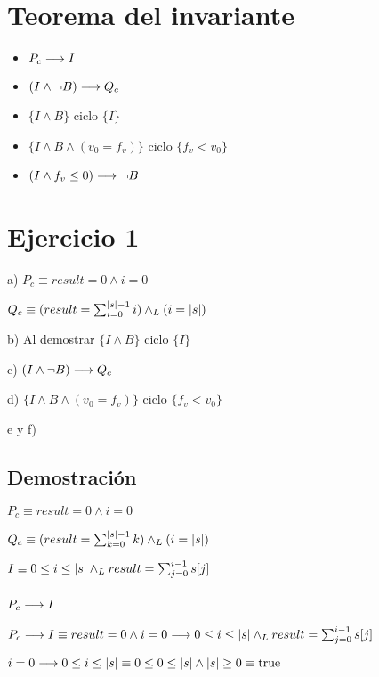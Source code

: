 \documentclass{article}
\begin{document}
\section*{Teorema del invariante}
\begin{itemize}
    \item $P_{c} \longrightarrow I$
    \item $(I \wedge \neg B) \longrightarrow Q_{c}$
    \item $\{I \wedge B\}$ ciclo $\{ I \}$
    \item $\{I \wedge B \wedge (v_{0} = f_{v})\}$ ciclo $\{f_{v} < v_{0}\}$
    \item $(I \wedge f_{v} \leq 0) \longrightarrow \neg B$
\end{itemize}

\section*{Ejercicio 1}

a) $P_{c} \equiv result = 0 \wedge i = 0$

    $Q_{c} \equiv 
        (result = \sum_{i=0}^{|s|-1} i) \land _L
        (i = |s|)$

b) Al demostrar $\{I \wedge B\}$ ciclo $\{ I \}$

c) $(I \wedge \neg B) \longrightarrow Q_{c}$

d) $\{I \wedge B \wedge (v_{0} = f_{v})\}$ ciclo $\{f_{v} < v_{0}\}$

e y f)

\subsection*{Demostración}

$P_{c} \equiv result = 0 \wedge i = 0$

$Q_{c} \equiv 
    (result = \sum_{k=0}^{|s|-1} k) \land _L
    (i = |s|)$

$I \equiv 0 \leq i \leq |s| \land _L result = \sum_{j=0}^{i-1} s[j]$

\subsubsection*{$P_{c} \longrightarrow I$}

$P_{c} \longrightarrow I \equiv 
    result = 0 \wedge i = 0 \longrightarrow 
        0 \leq i \leq |s| \land _L result = \sum_{j=0}^{i-1} s[j]$

$i = 0 \longrightarrow 0 \leq i \leq |s| \equiv
    0 \leq 0 \leq |s| \wedge |s| \geq 0 \equiv
    \mathrm{true}$
\end{document}
